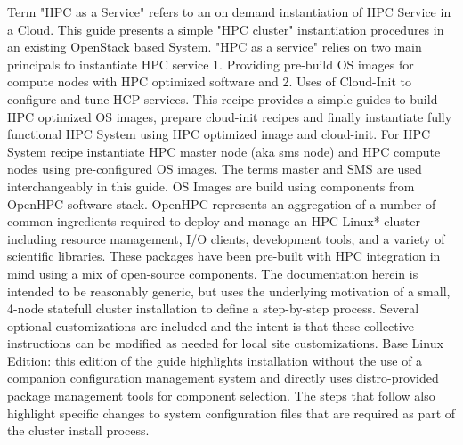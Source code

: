 Term "HPC as a Service" refers to an on demand instantiation of HPC Service in a Cloud. This guide presents a simple "HPC cluster" instantiation procedures in an existing OpenStack based System. "HPC as a service" relies on two main principals to instantiate HPC service 
	1. Providing pre-build OS images for compute nodes with HPC optimized software and 
	2. Uses of Cloud-Init to configure and tune HCP services. This recipe provides a simple guides to build HPC optimized OS images, prepare cloud-init recipes and finally instantiate fully functional HPC System using HPC optimized image and cloud-init. 
For HPC System recipe instantiate HPC master node (aka sms node) and HPC compute nodes using pre-configured OS images. The terms master and SMS are used interchangeably in this guide.
OS Images are build using components from OpenHPC software stack. OpenHPC represents an aggregation of a number of common ingredients required to deploy and manage an HPC Linux* cluster including resource management, I/O clients, development tools, and a variety of scientific libraries. These packages have been pre-built with HPC integration in mind using a mix of open-source components. The documentation herein is intended to be reasonably generic,
but uses the underlying motivation of a small, 4-node statefull cluster installation to define a step-by-step
process. Several optional customizations are included and the intent is that these collective instructions can
be modified as needed for local site customizations.
Base Linux Edition: this edition of the guide highlights installation without the use of a companion configuration management system and directly uses distro-provided package management tools for component selection. The steps that follow also highlight specific changes to system configuration files that are required as part of the cluster install process.
